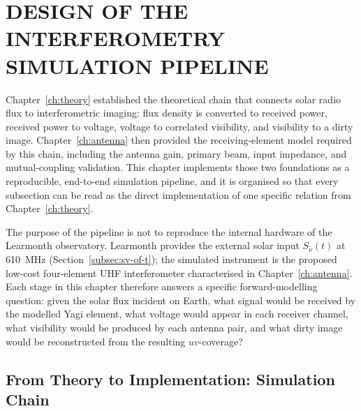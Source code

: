 \chapter{DESIGN OF THE INTERFEROMETRY SIMULATION PIPELINE}
\label{ch:pipeline}

Chapter~\ref{ch:theory} established the theoretical chain that connects solar
radio flux to interferometric imaging: flux density is converted to received
power, received power to voltage, voltage to correlated visibility, and
visibility to a dirty image. Chapter~\ref{ch:antenna} then provided the
receiving-element model required by this chain, including the antenna gain,
primary beam, input impedance, and mutual-coupling validation. This chapter
implements those two foundations as a reproducible, end-to-end simulation
pipeline, and it is organised so that every subsection can be read as the
direct implementation of one specific relation from Chapter~\ref{ch:theory}.

The purpose of the pipeline is not to reproduce the internal hardware of the
Learmonth observatory. Learmonth provides the external solar input
$S_\nu(t)$ at \SI{610}{\mega\hertz} (Section~\ref{subsec:sv-of-t}); the
simulated instrument is the proposed low-cost four-element UHF
interferometer characterised in Chapter~\ref{ch:antenna}. Each stage in this
chapter therefore answers a specific forward-modelling question: given the
solar flux incident on Earth, what signal would be received by the modelled
Yagi element, what voltage would appear in each receiver channel, what
visibility would be produced by each antenna pair, and what dirty image
would be reconstructed from the resulting $uv$-coverage?

\section{From Theory to Implementation: Simulation Chain}
\label{sec:blockdiagram}


